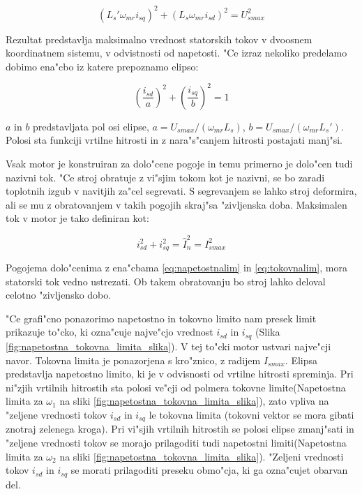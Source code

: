 \documentclass[journal,a4paper,twoside]{sty/IEEEtran}
\begin{document}
\begin{equation}
(L_s' \omega_{mr} i_{sq})^2+(L_s \omega_{mr}i_{sd})^2= U_{smax}^2
\label{eq:napetostnalim1}
\end{equation}

Rezultat predstavlja maksimalno vrednost statorskih tokov v dvoosnem koordinatnem sistemu, v odvistnosti od napetosti. "Ce izraz nekoliko predelamo dobimo ena"cbo iz katere prepoznamo elipso: 

\begin{equation}
(\frac{i_{sd}}{a})^2+(\frac{i_{sq}}{b})^2 = 1
\label{eq:napetostnalim}
\end{equation}

$a$ in $b$ predstavljata pol osi elipse, $a=U_{smax}/(\omega_{mr}L_s)$, $b=U_{smax}/(\omega_{mr}L_s')$. Polosi sta funkciji vrtilne hitrosti in z nara"s"canjem hitrosti postajati manj"si.

Vsak motor je konstruiran za dolo"cene pogoje in temu primerno je dolo"cen tudi nazivni tok. "Ce stroj obratuje z vi"sjim tokom kot je nazivni, se bo zaradi toplotnih izgub v navitjih za"cel segrevati. S segrevanjem se lahko stroj deformira, ali se mu z obratovanjem v takih pogojih skraj"sa "zivljenska doba. Maksimalen tok v motor je tako definiran kot:

\begin{equation}
i_{sd}^2+i_{sq}^2=\hat{I}_{n}^2=I_{smax}^2
\label{eq:tokovnalim}
\end{equation}

Pogojema dolo"cenima z ena"cbama \ref{eq:napetostnalim} in \ref{eq:tokovnalim}, mora statorski tok vedno ustrezati. Ob takem obratovanju bo stroj lahko deloval celotno "zivljensko dobo.\cite{vas}

"Ce grafi"cno ponazorimo napetostno in tokovno limito nam presek limit prikazuje to"cko, ki ozna"cuje najve"cjo vrednost $i_{sd}$ in $i_{sq}$ (Slika \ref{fig:napetostna_tokovna_limita_slika}). V tej to"cki motor ustvari najve"cji navor. Tokovna limita je ponazorjena s kro"znico, z radijem $I_{smax}$. Elipsa predstavlja napetostno limito, ki je v odvisnosti od vrtilne hitrosti spreminja. Pri ni"zjih vrtilnih hitrostih sta polosi ve"cji od polmera tokovne limite(Napetostna limita za $\omega_1$ na sliki \ref{fig:napetostna_tokovna_limita_slika}), zato vpliva na "zeljene vrednosti tokov $i_{sd}$ in $i_{sq}$ le tokovna limita (tokovni vektor se mora gibati znotraj zelenega kroga). Pri vi"sjih vrtilnih hitrostih se polosi elipse zmanj"sati in "zeljene vrednosti tokov se morajo prilagoditi tudi napetostni limiti(Napetostna limita za $\omega_2$ na sliki \ref{fig:napetostna_tokovna_limita_slika}). "Zeljeni vrednosti tokov $i_{sd}$ in $i_{sq}$ se morati prilagoditi preseku obmo"cja, ki ga ozna"cujet obarvan del.
\end{document}

